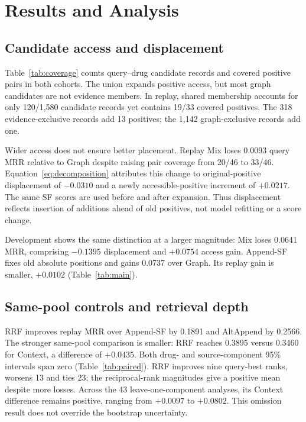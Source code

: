 \section{Results and Analysis}
\label{sec:results}
\subsection{Candidate access and displacement}
Table~\ref{tab:coverage} counts query--drug candidate records and covered positive pairs in both cohorts. The union expands positive access, but most graph candidates are not evidence members. In replay, shared membership accounts for only 120/1,580 candidate records yet contains 19/33 covered positives. The 318 evidence-exclusive records add 13 positives; the 1,142 graph-exclusive records add one.


Wider access does not ensure better placement. Replay Mix loses 0.0093 query MRR relative to Graph despite raising pair coverage from 20/46 to 33/46. Equation~\eqref{eq:decomposition} attributes this change to original-positive displacement of $-0.0310$ and a newly accessible-positive increment of $+0.0217$. The same SF scores are used before and after expansion. Thus displacement reflects insertion of additions ahead of old positives, not model refitting or a score change.

Development shows the same distinction at a larger magnitude: Mix loses 0.0641 MRR, comprising $-0.1395$ displacement and $+0.0754$ access gain. Append-SF fixes old absolute positions and gains 0.0737 over Graph. Its replay gain is smaller, $+0.0102$ (Table~\ref{tab:main}).

\subsection{Same-pool controls and retrieval depth}

RRF improves replay MRR over Append-SF by 0.1891 and AltAppend by 0.2566. The stronger same-pool comparison is smaller: RRF reaches 0.3895 versus 0.3460 for Context, a difference of $+0.0435$. Both drug- and source-component 95\% intervals span zero (Table~\ref{tab:paired}). RRF improves nine query-best ranks, worsens 13 and ties 23; the reciprocal-rank magnitudes give a positive mean despite more losses. Across the 43 leave-one-component analyses, its Context difference remains positive, ranging from $+0.0097$ to $+0.0802$. This omission result does not override the bootstrap uncertainty.


